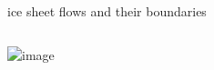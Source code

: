 \documentclass[hide notes,intlimits,usenames,dvipsnames]{beamer}
\begin{document}
\begin{frame}{ice sheet flows and their boundaries}
\begin{columns}
\begin{column}{0.55\textwidth}
\includegraphics<2>[height=0.85\textheight]{jako-crop-mask-900m.png}
\end{column}
\end{columns}
\end{frame}
\end{document}
